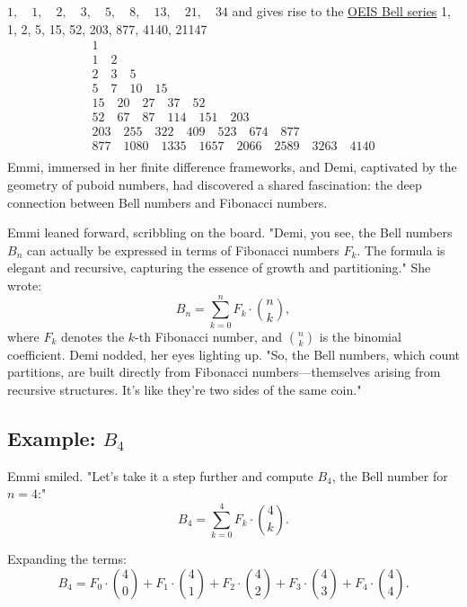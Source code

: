 \(
1, \quad 1, \quad 2, \quad 3, \quad 5, \quad 8, \quad 13, \quad 21, \quad 34 \) and gives rise to the \href{https://oeis.org/A000110}{OEIS Bell series} 1, 1, 2, 5, 15, 52, 203, 877, 4140, 21147 \label{eq:Bellseries}
\[
\begin{array}{c}
1 \\
1 \quad 2 \\
2 \quad 3 \quad 5 \\
5 \quad 7 \quad 10 \quad 15 \\
15 \quad 20 \quad 27 \quad 37 \quad 52 \\
52 \quad 67 \quad 87 \quad 114 \quad 151 \quad 203 \\
203 \quad 255 \quad 322 \quad 409 \quad 523 \quad 674 \quad 877 \\
877 \quad 1080 \quad 1335 \quad 1657 \quad 2066 \quad 2589 \quad 3263 \quad 4140 \\
\end{array}
\]
Emmi, immersed in her finite difference frameworks, and Demi, captivated by the geometry of puboid numbers, had discovered a shared fascination: the deep connection between Bell numbers and Fibonacci numbers.

Emmi leaned forward, scribbling on the board. "Demi, you see, the Bell numbers \(B_n\) can actually be expressed in terms of Fibonacci numbers \(F_k\). The formula is elegant and recursive, capturing the essence of growth and partitioning." She wrote:
\[
B_n = \sum_{k=0}^n F_k \cdot \binom{n}{k},
\]
where \(F_k\) denotes the \(k\)-th Fibonacci number, and \(\binom{n}{k}\) is the binomial coefficient.
Demi nodded, her eyes lighting up. "So, the Bell numbers, which count partitions, are built directly from Fibonacci numbers—themselves arising from recursive structures. It’s like they’re two sides of the same coin."

\subsection*{Example: \(B_4\)}

Emmi smiled. "Let’s take it a step further and compute \(B_4\), the Bell number for \(n=4\):"
\[
B_4 = \sum_{k=0}^4 F_k \cdot \binom{4}{k}.
\]

Expanding the terms:
\[
B_4 = F_0 \cdot \binom{4}{0} + F_1 \cdot \binom{4}{1} + F_2 \cdot \binom{4}{2} + F_3 \cdot \binom{4}{3} + F_4 \cdot \binom{4}{4}.
\]

